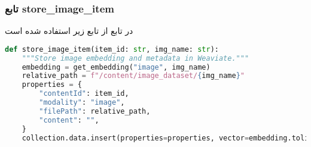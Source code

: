 \documentclass{article}
\begin{document}
\subsubsection*{تابع store\_image\_item}

در تابع  از تابع زیر استفاده شده است


\begin{latin}
\begin{lstlisting}[language=python]
def store_image_item(item_id: str, img_name: str):
    """Store image embedding and metadata in Weaviate."""
    embedding = get_embedding("image", img_name)
    relative_path = f"/content/image_dataset/{img_name}"
    properties = {
        "contentId": item_id,
        "modality": "image",
        "filePath": relative_path,
        "content": "",
    }
    collection.data.insert(properties=properties, vector=embedding.tolist())
\end{lstlisting}
\end{latin}
\end{document}
